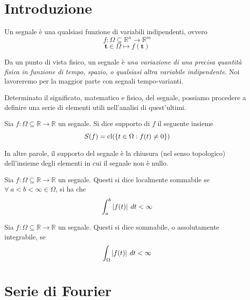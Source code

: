 
\section{Introduzione}
    \begin{definition}
        Un segnale è una qualsiasi funzione di variabili indipendenti, ovvero
        \[
            f: \Omega \subseteq \mathbb{R}^{n} \rightarrow \mathbb{R}^{m}
        \]
        \[
            \mathbf{t} \in \Omega \mapsto f(\mathbf{t})
        \]
    \end{definition}

    Da un punto di vista fisico, un segnale è \textit{una variazione di una precisa quantità fisica in funzione di tempo, spazio, o qualsiasi altra variabile indipendente}.
    Noi lavoreremo per la maggior parte con segnali tempo-varianti.

    Determinato il significato, matematico e fisico, del segnale, possiamo procedere a definire una serie di elementi utili nell'analisi di quest'ultimi.

    \begin{definition}
        Sia $f: \Omega \subseteq \mathbb{R} \rightarrow \mathbb{R}$ un segnale.
        Si dice supporto di $f$ il seguente insieme
        \[
            S(f) = \operatorname{cl}({\{t \in \Omega \mathrel{:} f(t) \neq 0\}})
        \]
    \end{definition}

    In altre parole, il supporto del segnale è la chiusura (nel senso topologico) dell'insieme degli elementi in cui il segnale non è nullo.

    \begin{definition}
        Sia $f: \Omega \subseteq \mathbb{R} \rightarrow \mathbb{R}$ un segnale.
        Questi si dice localmente sommabile se $\forall \: a < b < \infty \in \Omega$, si ha che
        \[
            \int_{a}^{b} \left\lvert f(t) \right\rvert \: dt < \infty
        \]
    \end{definition}

    \begin{definition}
        Sia $f: \Omega \subseteq \mathbb{R} \rightarrow \mathbb{R}$ un segnale.
        Questi si dice sommabile, o assolutamente integrabile, se
        \[
            \int_{\Omega} \left\lvert f(t) \right\rvert \: dt < \infty
        \]
    \end{definition}

\clearpage
\section{Serie di Fourier}
